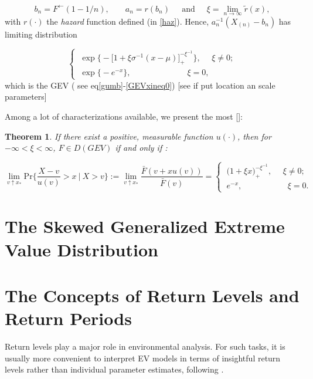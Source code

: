 \documentclass[11pt,a4paper,openany ]{book}
\newtheorem{theorem}{Theorem}[chapter]
\begin{document}
\begin{equation*}
b_n=F^{\leftarrow}(1-1/n)\text{, } \ \ \ \ \ \ \ \ a_n=r(b_n) \ \ \ \ \ \text{ and } \ \ \ \ \ \xi=\displaystyle{\lim_{n \to \infty}}\tilde{r}(x),
\end{equation*}
with $r(\cdot)$ the \emph{hazard} function defined (in \ref{haz}). Hence, $a_n^{-1}(X_{(n)}-b_n)$ has limiting distribution

\begin{equation*}
\begin{cases}
\ \exp\Big\{-\big[1+\xi\sigma^{-1}(x-\mu)\big]_+^{-\xi^{-1}}\Big\}, \ \ \ \ \ \ \xi\neq 0; 
\\
\ \exp\big\{-e^{-x}\big\}, \ \ \ \ \ \ \ \ \ \ \ \ \ \ \ \ \ \ \ \ \ \ \ \ \ \ \ \ \  \  \ \xi=0,
\end{cases}
\end{equation*}
which is the GEV ( see eq\ref{gumb}-\ref{GEVxineq0}) [see if put location an scale parameters]

Among a lot of characterizations available, we present the most []:
\begin{theorem}
	If there exist a positive, measurable function $u(\cdot)$, then for $-\infty<\xi<\infty$, $F\in D(GEV)$ if and only if :
	
	\begin{equation}
	\displaystyle{\lim_{v \uparrow x_*}} \text{Pr} \Bigg\{\frac{X-v}{u(v)}>x \ | \ X>v\Bigg\}:=\displaystyle{\lim_{v \uparrow x_*}}\frac{\bar{F}(v+xu(v))}{\bar{F}(v)}=\begin{cases}
	\ \Big(1+\xi x\Big)_+^{-\xi^{-1}}, \ \ \ \ \ \ \xi\neq 0;    \\
	\  e^{-x}, \ \ \ \ \ \ \ \ \ \ \ \ \ \ \ \ \qquad \xi=0.
	\end{cases}
	\end{equation}

\end{theorem}

\section{The Skewed Generalized Extreme Value Distribution}
\cite{ribereau_skew_2016}


\section{The Concepts of Return Levels and Return Periods}\label{rlgev}

Return levels play a major role in environmental analysis. For such tasks, it is usually more convenient to interpret EV models in terms of insightful return levels rather than individual parameter estimates, following \citet[pp.49,pp.81]{coles_introduction_2001}. 
\end{document}

